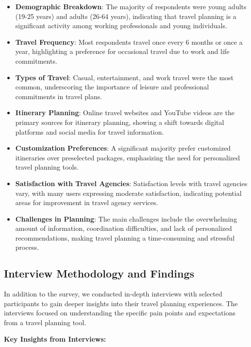 \documentclass[conference]{IEEEtran}
\begin{document}
\begin{itemize}
    \item \textbf{Demographic Breakdown}: The majority of respondents were young adults (19-25 years) and adults (26-64 years), indicating that travel planning is a significant activity among working professionals and young individuals.
    \item \textbf{Travel Frequency}: Most respondents travel once every 6 months or once a year, highlighting a preference for occasional travel due to work and life commitments.
    \item \textbf{Types of Travel}: Casual, entertainment, and work travel were the most common, underscoring the importance of leisure and professional commitments in travel plans.
    \item \textbf{Itinerary Planning}: Online travel websites and YouTube videos are the primary sources for itinerary planning, showing a shift towards digital platforms and social media for travel information.
    \item \textbf{Customization Preferences}: A significant majority prefer customized itineraries over preselected packages, emphasizing the need for personalized travel planning tools.
    \item \textbf{Satisfaction with Travel Agencies}: Satisfaction levels with travel agencies vary, with many users expressing moderate satisfaction, indicating potential areas for improvement in travel agency services.
    \item \textbf{Challenges in Planning}: The main challenges include the overwhelming amount of information, coordination difficulties, and lack of personalized recommendations, making travel planning a time-consuming and stressful process.
\end{itemize}

\subsection{Interview Methodology and Findings}
In addition to the survey, we conducted in-depth interviews with selected participants to gain deeper insights into their travel planning experiences. The interviews focused on understanding the specific pain points and expectations from a travel planning tool.

\textbf{Key Insights from Interviews:}
\end{document}
